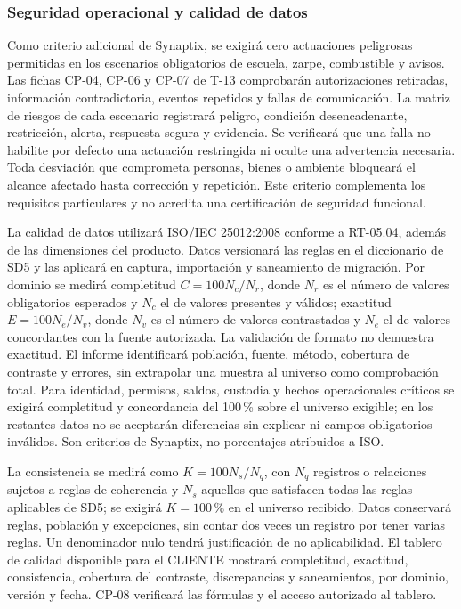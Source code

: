 \subsubsection{Seguridad operacional y calidad de datos}
Como criterio adicional de Synaptix, se exigirá cero actuaciones peligrosas permitidas en los escenarios obligatorios de escuela, zarpe, combustible y avisos. Las fichas CP-04, CP-06 y CP-07 de T-13 comprobarán autorizaciones retiradas, información contradictoria, eventos repetidos y fallas de comunicación. La matriz de riesgos de cada escenario registrará peligro, condición desencadenante, restricción, alerta, respuesta segura y evidencia. Se verificará que una falla no habilite por defecto una actuación restringida ni oculte una advertencia necesaria. Toda desviación que comprometa personas, bienes o ambiente bloqueará el alcance afectado hasta corrección y repetición. Este criterio complementa los requisitos particulares y no acredita una certificación de seguridad funcional. \parencite{sd9-25010}

La calidad de datos utilizará ISO/IEC 25012:2008 conforme a RT-05.04, además de las dimensiones del producto. Datos versionará las reglas en el diccionario de SD5 y las aplicará en captura, importación y saneamiento de migración. Por dominio se medirá completitud $C=100N_c/N_r$, donde $N_r$ es el número de valores obligatorios esperados y $N_c$ el de valores presentes y válidos; exactitud $E=100N_e/N_v$, donde $N_v$ es el número de valores contrastados y $N_e$ el de valores concordantes con la fuente autorizada. La validación de formato no demuestra exactitud. El informe identificará población, fuente, método, cobertura de contraste y errores, sin extrapolar una muestra al universo como comprobación total. Para identidad, permisos, saldos, custodia y hechos operacionales críticos se exigirá completitud y concordancia del 100\,\% sobre el universo exigible; en los restantes datos no se aceptarán diferencias sin explicar ni campos obligatorios inválidos. Son criterios de Synaptix, no porcentajes atribuidos a ISO. \parencites{sd9-25012}[art.~23, pp.~16--17]{sd9-ba}[sec.~5.3]{sd9-sd5}

La consistencia se medirá como $K=100N_s/N_q$, con $N_q$ registros o relaciones sujetos a reglas de coherencia y $N_s$ aquellos que satisfacen todas las reglas aplicables de SD5; se exigirá $K=100\,\%$ en el universo recibido. Datos conservará reglas, población y excepciones, sin contar dos veces un registro por tener varias reglas. Un denominador nulo tendrá justificación de no aplicabilidad. El tablero de calidad disponible para el CLIENTE mostrará completitud, exactitud, consistencia, cobertura del contraste, discrepancias y saneamientos, por dominio, versión y fecha. CP-08 verificará las fórmulas y el acceso autorizado al tablero. \parencite[RT-05.04, p.~11]{sd9-bt}

